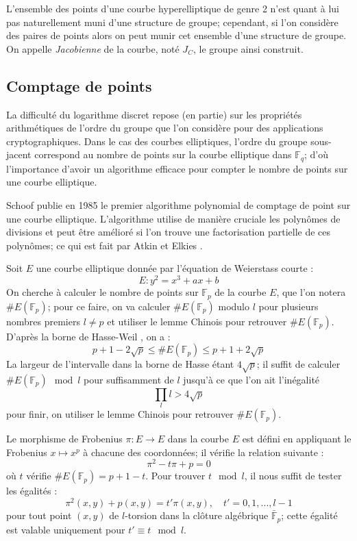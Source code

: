 \documentclass[a4paper]{article}
\theoremstyle{definition}
\theoremstyle{remark}
\numberwithin{equation}{section}
\begin{document}
L'ensemble des points d'une courbe hyperelliptique de genre 2 n'est quant à lui pas naturellement muni d'une structure de groupe; cependant, si l'on considère des paires de points alors on peut munir cet ensemble d'une structure de groupe. On appelle \emph{Jacobienne} de la courbe, noté $J_C$, le groupe ainsi construit.

\subsection{Comptage de points}
La difficulté du logarithme discret repose (en partie) sur les propriétés arithmétiques de l'ordre du groupe que l'on considère pour des applications cryptographiques. Dans le cas des courbes elliptiques, l'ordre du groupe sous-jacent correspond au nombre de points sur la courbe elliptique dans $\mathbb{F}_q$; d'où l'importance d'avoir un algorithme efficace pour compter le nombre de points sur une courbe elliptique.

Schoof \cite{schoof} publie en 1985 le premier algorithme polynomial de comptage de point sur une courbe elliptique. L'algorithme utilise de manière cruciale les polynômes de divisions et peut être amélioré si l'on trouve une factorisation partielle de ces polynômes; ce qui est fait par Atkin \cite{atkin} et Elkies \cite{elkies}.

Soit $E$ une courbe elliptique donnée par l'équation de Weierstass courte :
$$E : y^2 = x^3 + ax + b$$
On cherche à calculer le nombre de points sur $\mathbb{F}_p$ de la courbe $E$, que l'on notera $\#E(\mathbb{F}_p)$; pour ce faire, on va calculer $\#E(\mathbb{F}_p)$ modulo $l$ pour plusieurs nombres premiers $l \neq p$ et utiliser le lemme Chinois pour retrouver $\#E(\mathbb{F}_p)$. D'après la borne de Hasse-Weil \cite{weil}, on a :
$$p+1 - 2\sqrt{p} \leq \#E(\mathbb{F}_p) \leq p+1 + 2\sqrt{p}$$
La largeur de l'intervalle dans la borne de Hasse étant $4\sqrt{p}$; il suffit de calculer $\#E(\mathbb{F}_p) \mod l$ pour suffisamment de $l$ jusqu'à ce que l'on ait l'inégalité
\begin{equation}
\label{inegaliteSchoof}
\prod_l l > 4\sqrt{p}
\end{equation}
pour finir, on utiliser le lemme Chinois pour retrouver $\#E(\mathbb{F}_p)$.

Le morphisme de Frobenius $\pi : E \longrightarrow E$ dans la courbe $E$ est défini en appliquant le Frobenius $x \mapsto x^p$ à chacune des coordonnées; il vérifie la relation suivante :
$$\pi^2 - t\pi + p = 0$$
où $t$ vérifie $\#E(\mathbb{F}_p) = p + 1 - t$. Pour trouver $t \mod l$, il nous suffit de tester les égalités :
$$\pi^2(x,y) + p(x,y) = t'\pi(x,y), \quad t' = 0,1,...,l-1$$
pour tout point $(x,y)$ de $l$-torsion dans la clôture algébrique $\bar{\mathbb{F}}_p$; cette égalité est valable uniquement pour $t' \equiv t \mod l$.
\end{document}
